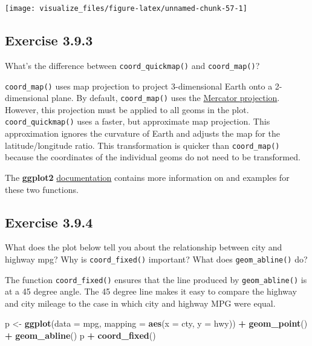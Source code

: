 \documentclass[]{book}
\newenvironment{Shaded}{\begin{snugshade}}{\end{snugshade}}
\newcommand{\DataTypeTok}[1]{\textcolor[rgb]{0.13,0.29,0.53}{#1}}
\newcommand{\KeywordTok}[1]{\textcolor[rgb]{0.13,0.29,0.53}{\textbf{#1}}}
\newcommand{\NormalTok}[1]{#1}
\newcommand{\OperatorTok}[1]{\textcolor[rgb]{0.81,0.36,0.00}{\textbf{#1}}}
\newcommand{\StringTok}[1]{\textcolor[rgb]{0.31,0.60,0.02}{#1}}
\theoremstyle{plain}
\theoremstyle{remark}
\theoremstyle{definition}
\theoremstyle{definition}
\theoremstyle{definition}
\theoremstyle{remark}
\begin{document}
\begin{center}\texttt{[image: visualize\_files/figure-latex/unnamed-chunk-57-1]} \end{center}

\hypertarget{exercise-3.9.3}{%
\subsection*{\texorpdfstring{Exercise
{3.9.3}}{Exercise 3.9.3}}\label{exercise-3.9.3}}

What's the difference between \texttt{coord\_quickmap()} and
\texttt{coord\_map()}?

\texttt{coord\_map()} uses map projection to project 3-dimensional Earth
onto a 2-dimensional plane. By default, \texttt{coord\_map()} uses the
\href{https://en.wikipedia.org/wiki/Mercator_projection}{Mercator
projection}. However, this projection must be applied to all geoms in
the plot. \texttt{coord\_quickmap()} uses a faster, but approximate map
projection. This approximation ignores the curvature of Earth and
adjusts the map for the latitude/longitude ratio. This transformation is
quicker than \texttt{coord\_map()} because the coordinates of the
individual geoms do not need to be transformed.

The \textbf{ggplot2}
\href{http://docs.ggplot2.org/current/coord_map.html}{documentation}
contains more information on and examples for these two functions.

\hypertarget{exercise-3.9.4}{%
\subsection*{\texorpdfstring{Exercise
{3.9.4}}{Exercise 3.9.4}}\label{exercise-3.9.4}}

What does the plot below tell you about the relationship between city
and highway mpg? Why is \texttt{coord\_fixed()} important? What does
\texttt{geom\_abline()} do?

The function \texttt{coord\_fixed()} ensures that the line produced by
\texttt{geom\_abline()} is at a 45 degree angle. The 45 degree line
makes it easy to compare the highway and city mileage to the case in
which city and highway MPG were equal.

\begin{Shaded}
\begin{Highlighting}[]
\NormalTok{p <-}\StringTok{ }\KeywordTok{ggplot}\NormalTok{(}\DataTypeTok{data =}\NormalTok{ mpg, }\DataTypeTok{mapping =} \KeywordTok{aes}\NormalTok{(}\DataTypeTok{x =}\NormalTok{ cty, }\DataTypeTok{y =}\NormalTok{ hwy)) }\OperatorTok{+}
\StringTok{  }\KeywordTok{geom_point}\NormalTok{() }\OperatorTok{+}
\StringTok{  }\KeywordTok{geom_abline}\NormalTok{()}
\NormalTok{p }\OperatorTok{+}\StringTok{ }\KeywordTok{coord_fixed}\NormalTok{()}
\end{Highlighting}
\end{Shaded}
\end{document}
